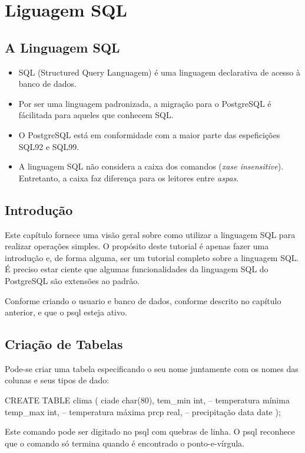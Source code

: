 \newpage \chapter{Liguagem SQL}\setcounter{SteP}{1}

\section{A Linguagem SQL}\setcounter{SteP}{1}
\begin{itemize}
	\item{\bf } SQL (Structured Query Languagem) é uma linguagem declarativa de acesso
	à banco de dados.
	\item{\bf }Por ser uma linguagem padronizada, a migração para o PostgreSQL é 
	fácilitada para aqueles que conhecem SQL.
	\item{\bf }O PostgreSQL está em conformidade com a maior parte das espeficições
	SQL92 e SQL99.
	\item{\bf }A linguagem SQL não considera a caixa dos comandos ({\it xase insensitive}).
	Entretanto, a caixa faz diferença para os leitores entre {\it aspas}.
\end{itemize}

\section{Introdução}\setcounter{SteP}{1}
Este capítulo fornece uma visão geral sobre como utilizar a linguagem SQL para realizar operações simples. 
O propósito deste tutorial é apenas fazer uma introdução e, de forma alguma, ser um tutorial completo sobre a linguagem SQL.
É preciso estar ciente que algumas funcionalidades da linguagem SQL do PostgreSQL são extensões ao padrão.

Conforme criando o usuario e banco de dados, conforme descrito no capítulo anterior, e que o 
psql esteja ativo.

\section{Criação de Tabelas}\setcounter{SteP}{1}
Pode-se criar uma tabela especificando o seu nome juntamente com os nomes das colunas e seus tipos de dado:
\begin{BoxVerbatim}
CREATE TABLE clima (
    ciade           char(80),
    tem_min         int,             -- temperatura mínima
    temp_max        int,             -- temperatura máxima
    prcp            real,            -- precipitação
    data            date     
);
\end{BoxVerbatim}
Este comando pode ser digitado no psql com quebras de linha. 
O psql reconhece que o comando só termina quando é encontrado o ponto-e-vírgula.

